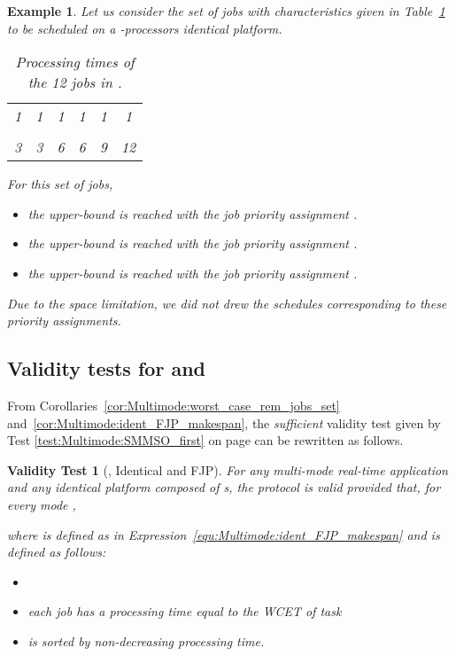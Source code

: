 \documentclass{article}
\newtheorem{validity test}{Validity Test}
\newtheorem{Example}{Example}
\begin{document}
\begin{Example}
Let us consider the set of  jobs with characteristics given in Table~\ref{tab:Multimode:tight_upper_bound_example} to be scheduled on a -processors identical platform. 
\begin{table}[h!]
\centering
\begin{tabular}{| c | c | c | c | c | c |}
\hline
 &  &  &  &  & \\
\hline
1 & 1 & 1 & 1 & 1 & 1 \\
\hline
 &  &  &  &  & \\
\hline
3 & 3 & 6 & 6 & 9 & 12 \\
\hline
\end{tabular}
\caption{Processing times of the 12 jobs in .}
\label{tab:Multimode:tight_upper_bound_example}
\end{table}

\noindent For this set of jobs,
\begin{itemize}
\item the upper-bound  is reached with the job priority assignment .
\item the upper-bound  is reached with the job priority assignment .
\item the upper-bound  is reached with the job priority assignment .
\end{itemize}

\noindent Due to the space limitation, we did not drew the schedules corresponding to these priority assignments.
\end{Example}

\subsection{Validity tests for  and }
\label{sec:Multimode:ident_FJP_validity_test}

From Corollaries~\ref{cor:Multimode:worst_case_rem_jobs_set} and~\ref{cor:Multimode:ident_FJP_makespan}, the \emph{sufficient} validity test given by Test \ref{test:Multimode:SMMSO_first} on page \pageref{test:Multimode:SMMSO_first} can be rewritten as follows. 

\begin{validity test}[, Identical and FJP]
\label{validitytest:Multimode:ident_FJP_SMMSO}
For any multi-mode real-time application  and any identical platform  composed of  s, the protocol  is valid provided that, for every mode ,

where  is defined as in Expression~\ref{equ:Multimode:ident_FJP_makespan} and  is defined as follows: 
\begin{itemize}
\renewcommand{\labelitemi}{}
\item 
\item each job  has a processing time equal to the WCET  of task 
\item  is sorted by non-decreasing processing time.
\end{itemize}
 \end{validity test}
\end{document}
